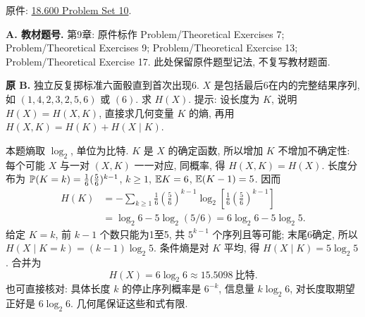 原件: \href{https://ocw.mit.edu/courses/18-600-probability-and-random-variables-fall-2019/resources/mit18_600f19_pset10/}{18.600 Problem Set 10}.
\par\noindent\textbf{A. 教材题号.} 第9章: \label{part:P10.A.1} 原件标作 Problem/Theoretical Exercises 7; \label{part:P10.A.2} Problem/Theoretical Exercises 9; \label{part:P10.A.3} Problem/Theoretical Exercise 13; \label{part:P10.A.4} Problem/Theoretical Exercise 17. 此处保留原件题型记法, 不复写教材题面.

\begin{exercise}\label{ex:P10.B}\label{part:P10.B}
\textbf{原 B.} 独立反复掷标准六面骰直到首次出现6. $X$ 是包括最后6在内的完整结果序列, 如 $(1,4,2,3,2,5,6)$ 或 $(6)$. 求 $H(X)$. 提示: 设长度为 $K$, 说明 $H(X)=H(X,K)$, 直接求几何变量 $K$ 的熵, 再用 $H(X,K)=H(K)+H(X\mid K)$.
\end{exercise}
\begin{solution}\label{sol:P10.B}
本题熵取 $\log_2$, 单位为比特. $K$ 是 $X$ 的确定函数, 所以增加 $K$ 不增加不确定性: 每个可能 $X$ 与一对 $(X,K)$ 一一对应, 同概率, 得 $H(X,K)=H(X)$. 长度分布为 $\mathbb P(K=k)=\frac16(\frac56)^{k-1}$, $k\ge1$, $\mathbb E K=6$, $\mathbb E(K-1)=5$. 因而
\begin{align*}
 H(K)&=-\sum_{k\ge1}\frac16\left(\frac56\right)^{k-1}
       \log_2\left[\frac16\left(\frac56\right)^{k-1}\right]\\
 &=\log_2 6-5\log_2(5/6)=6\log_2 6-5\log_2 5.
\end{align*}
给定 $K=k$, 前 $k-1$ 个数只能为1至5, 共 $5^{k-1}$ 个序列且等可能; 末尾6确定, 所以 $H(X\mid K=k)=(k-1)\log_2 5$. 条件熵是对 $K$ 平均, 得 $H(X\mid K)=5\log_2 5$. 合并为
\[
 H(X)=6\log_2 6\approx15.5098\ \text{比特}.
\]
也可直接核对: 具体长度 $k$ 的停止序列概率是 $6^{-k}$, 信息量 $k\log_2 6$, 对长度取期望正好是 $6\log_2 6$. 几何尾保证这些和式有限.
\end{solution}

